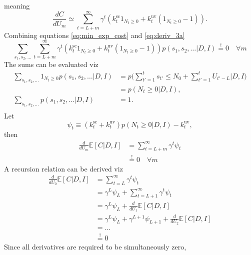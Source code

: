 meaning
\begin{equation}
	\frac{dC}{dU_m} \simeq \sum_{t=L+m}^{\infty}\gamma^{t}(k^\text{sc}_{t}1_{N_{t}\geq 0}+k_{t}^\text{uv}(1_{N_{t}\geq 0}-1)).
	\label{eq:deriv_3a}
\end{equation}
Combining equations \eqref{eq:min_exp_cost} and \eqref{eq:deriv_3a}
\begin{equation}
	\sum_{s_1,s_2,\dots}\sum_{t=L+m}^{\infty}\gamma^{t}(k^\text{sc}_{t}1_{N_{t}\geq 0}+k_{t}^\text{uv}(1_{N_{t}\geq 0}-1))p(s_1,s_{2},\dots|D,I)\overset{!}{=} 0\quad \forall m
\end{equation}
The sums can be evaluated viz
\begin{equation}
	\begin{split}
		\sum_{s_1,s_2,\dots}1_{N_{t}\geq 0}p(s_1,s_{2},\dots|D,I) &= p\bigg(\sum_{t'=1}^{t}s_{t'}\leq N_0+\sum_{t'=1}^{t}U_{t'-L}|D,I\bigg)\\
		&= p(N_t\geq 0|D,I),\\
		\sum_{s_1,s_2,\dots}p(s_1,s_{2},\dots|D,I)&=1.\\
	\end{split}
\end{equation}
Let
\begin{equation}
	\psi_t\equiv (k^\text{sc}_{t}+k_{t}^\text{uv})p(N_t\geq 0|D,I)-k_{t}^\text{uv},
\end{equation} 
then
\begin{equation}
	\begin{split}
		\frac{d}{dU_m}\mathbb{E}[C|D,I]& = \sum_{t=L+m}^{\infty}\gamma^{t}\psi_t\\
		&\overset{!}{=} 0\quad \forall m
	\end{split}
\end{equation}
A recursion relation can be derived viz
\begin{equation}
	\begin{split}
		\frac{d}{dU_0}\mathbb{E}[C|D,I] & = \sum_{t=L}^{\infty}\gamma^{t}\psi_t\\
		& =\gamma^{L}\psi_L+\sum_{t=L+1}^{\infty}\gamma^{t}\psi_t\\
		& =\gamma^{L}\psi_L+\frac{d}{dU_1}\mathbb{E}[C|D,I]\\
		& =\gamma^{L}\psi_L+\gamma^{L+1}\psi_{L+1}+\frac{d}{dU_2}\mathbb{E}[C|D,I]\\
		&=\dots\\
		&\overset{!}{=} 0
	\end{split} 
\end{equation}
Since all derivatives are required to be simultaneously zero,
